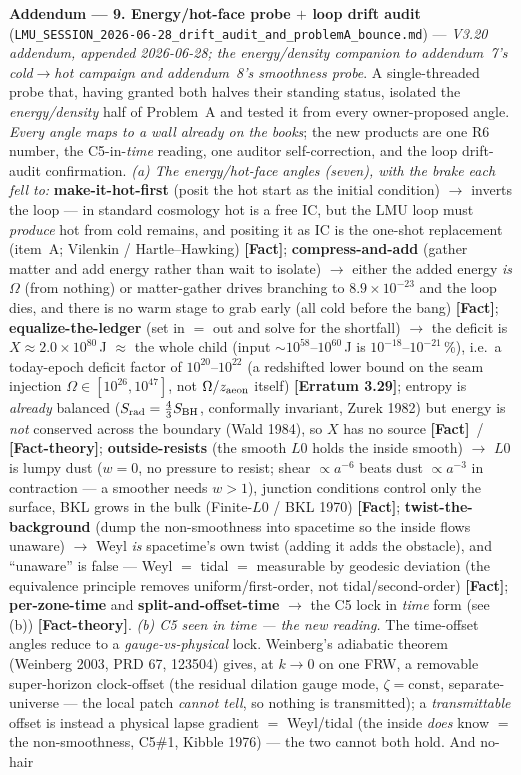 \documentclass[11pt]{article}
\newcommand{\Fact}{\textbf{\textcolor{green!45!black}{[Fact]}}}
\newcommand{\fact}{\textcolor{green!40!black}{\textbf{[Fact]}}}
\newcommand{\factth}{\textcolor{green!40!black}{\textbf{[Fact-theory]}}}
\begin{document}
\smallskip\noindent\textbf{Addendum --- 9. Energy/hot-face probe $+$ loop drift audit} (\texttt{LMU\_SESSION\_2026-06-28\_drift\_audit\_and\_problemA\_bounce.md}) --- \emph{V3.20 addendum, appended 2026-06-28; the energy/density companion to addendum~7's cold$\to$hot campaign and addendum~8's smoothness probe}. A single-threaded probe that, having granted both halves their standing status, isolated the \emph{energy/density} half of Problem~A and tested it from every owner-proposed angle. \emph{Every angle maps to a wall already on the books}; the new products are one R6 number, the C5-in-\emph{time} reading, one auditor self-correction, and the loop drift-audit confirmation. \emph{(a) The energy/hot-face angles (seven), with the brake each fell to:} \textbf{make-it-hot-first} (posit the hot start as the initial condition) $\to$ inverts the loop --- in standard cosmology hot is a free IC, but the LMU loop must \emph{produce} hot from cold remains, and positing it as IC is the one-shot replacement (item~A; Vilenkin / Hartle--Hawking) \Fact; \textbf{compress-and-add} (gather matter and add energy rather than wait to isolate) $\to$ either the added energy \emph{is} $\Omega$ (from nothing) or matter-gather drives branching to $8.9\times10^{-23}$ and the loop dies, and there is no warm stage to grab early (all cold before the bang) \Fact; \textbf{equalize-the-ledger} (set in $=$ out and solve for the shortfall) $\to$ the deficit is $X\approx2.0\times10^{80}$\,J $\approx$ the whole child (input $\sim10^{58}$--$10^{60}$\,J is $10^{-18}$--$10^{-21}$\,\%), i.e.\ a today-epoch deficit factor of $10^{20}$--$10^{22}$ (a redshifted lower bound on the seam injection $\Omega\in[10^{26},10^{47}]$, not $\Omega/z_{\rm aeon}$ itself) \textbf{[Erratum 3.29]}; entropy is \emph{already} balanced ($S_{\rm rad}=\tfrac43 S_{\rm BH}$, conformally invariant, Zurek 1982) but energy is \emph{not} conserved across the boundary (Wald 1984), so $X$ has no source \fact\ / \factth; \textbf{outside-resists} (the smooth $L0$ holds the inside smooth) $\to$ $L0$ is lumpy dust ($w=0$, no pressure to resist; shear $\propto a^{-6}$ beats dust $\propto a^{-3}$ in contraction --- a smoother needs $w>1$), junction conditions control only the surface, BKL grows in the bulk (Finite-$L0$ / BKL 1970) \Fact; \textbf{twist-the-background} (dump the non-smoothness into spacetime so the inside flows unaware) $\to$ Weyl \emph{is} spacetime's own twist (adding it adds the obstacle), and ``unaware'' is false --- Weyl $=$ tidal $=$ measurable by geodesic deviation (the equivalence principle removes uniform/first-order, not tidal/second-order) \Fact; \textbf{per-zone-time} and \textbf{split-and-offset-time} $\to$ the C5 lock in \emph{time} form (see (b)) \factth. \emph{(b) C5 seen in time --- the new reading.} The time-offset angles reduce to a \emph{gauge-vs-physical} lock. Weinberg's adiabatic theorem (Weinberg 2003, PRD 67, 123504) gives, at $k\to0$ on one FRW, a removable super-horizon clock-offset (the residual dilation gauge mode, $\zeta=$const, separate-universe --- the local patch \emph{cannot tell}, so nothing is transmitted); a \emph{transmittable} offset is instead a physical lapse gradient $=$ Weyl/tidal (the inside \emph{does} know $=$ the non-smoothness, C5\#1, Kibble 1976) --- the two cannot both hold. And no-hair 
\end{document}
